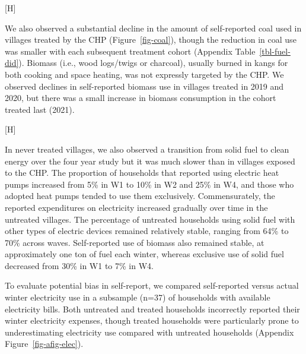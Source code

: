 \documentclass[
  letterpaper,
  DIV=11,
  numbers=noendperiod]{scrartcl}
\makeatletter
\renewenvironment{figure}%
   {\renewcommand\familydefault\sfdefault
    \@float{figure}}
   {\end@float}
\makeatother
\begin{document}
\begin{figure}[H]


\caption{\label{fig-sankey}Transitions to different energy sources
across study waves}

\end{figure}%

We also observed a substantial decline in the amount of self-reported
coal used in villages treated by the CHP (Figure~\ref{fig-coal}), though
the reduction in coal use was smaller with each subsequent treatment
cohort (Appendix Table~\ref{tbl-fuel-did}). Biomass (i.e., wood
logs/twigs or charcoal), usually burned in kangs for both cooking and
space heating, was not expressly targeted by the CHP. We observed
declines in self-reported biomass use in villages treated in 2019 and
2020, but there was a small increase in biomass consumption in the
cohort treated last (2021).

\begin{figure}[H]


\caption{\label{fig-coal}Trends in self-reported coal and biomass, by
treatment season.}

\end{figure}%

In never treated villages, we also observed a transition from solid fuel
to clean energy over the four year study but it was much slower than in
villages exposed to the CHP. The proportion of households that reported
using electric heat pumps increased from 5\% in W1 to 10\% in W2 and
25\% in W4, and those who adopted heat pumps tended to use them
exclusively. Commensurately, the reported expenditures on electricity
increased gradually over time in the untreated villages. The percentage
of untreated households using solid fuel with other types of electric
devices remained relatively stable, ranging from 64\% to 70\% across
waves. Self-reported use of biomass also remained stable, at
approximately one ton of fuel each winter, whereas exclusive use of
solid fuel decreased from 30\% in W1 to 7\% in W4.

To evaluate potential bias in self-report, we compared self-reported
versus actual winter electricity use in a subsample (n=37) of households
with available electricity bills. Both untreated and treated households
incorrectly reported their winter electricity expenses, though treated
households were particularly prone to underestimating electricity use
compared with untreated households (Appendix
Figure~\ref{fig-afig-elec}).
\end{document}
